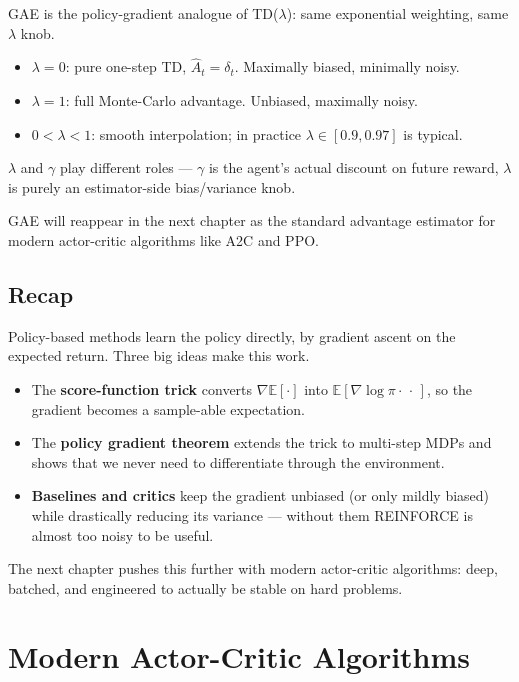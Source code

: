 \documentclass[11pt, oneside]{book}
\newcommand{\E}{\mathbb{E}}              %
\begin{document}
\begin{intbox}
GAE is the policy-gradient analogue of TD($\lambda$): same exponential weighting,
same $\lambda$ knob.
\begin{itemize}
  \item $\lambda = 0$: pure one-step TD, $\hat A_t = \delta_t$. Maximally biased,
    minimally noisy.
  \item $\lambda = 1$: full Monte-Carlo advantage. Unbiased, maximally noisy.
  \item $0 < \lambda < 1$: smooth interpolation; in practice
    $\lambda \in [0.9, 0.97]$ is typical.
\end{itemize}
$\lambda$ and $\gamma$ play different roles --- $\gamma$ is the agent's actual
discount on future reward, $\lambda$ is purely an estimator-side bias/variance knob.
\end{intbox}

GAE will reappear in the next chapter as the standard advantage estimator for modern
actor-critic algorithms like A2C and PPO.

\section{Recap}

Policy-based methods learn the policy directly, by gradient ascent on the expected
return. Three big ideas make this work.
\begin{itemize}
  \item The \textbf{score-function trick} converts $\nabla \E[\cdot]$ into
    $\E[\nabla \log \pi \cdot \,\cdot\,]$, so the gradient becomes a sample-able
    expectation.
  \item The \textbf{policy gradient theorem} extends the trick to multi-step MDPs
    and shows that we never need to differentiate through the environment.
  \item \textbf{Baselines and critics} keep the gradient unbiased (or only mildly
    biased) while drastically reducing its variance --- without them REINFORCE is
    almost too noisy to be useful.
\end{itemize}
The next chapter pushes this further with modern actor-critic algorithms: deep,
batched, and engineered to actually be stable on hard problems.


\chapter{Modern Actor-Critic Algorithms}
\end{document}
